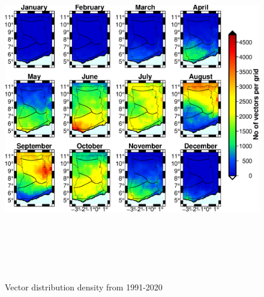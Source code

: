 \documentclass[utf8]{FrontiersinHarvard} %
\begin{document}
\begin{figure}[ht]
\begin{center}
\includegraphics[width=15cm,height=15cm]{vector_chirps_ERA5.eps}
\caption{Vector distribution density from 1991-2020}
\label{fig:3:5}
\end{center}
\end{figure}
\end{document}
